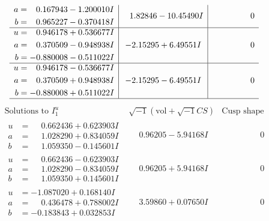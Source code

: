 \documentclass[1p]{elsarticle_modified}
\theoremstyle{definition}
\newcommand{\I}{\sqrt{-1}}
\begin{document}
$$\begin{array}{c|c|c}
\begin{aligned}
a &= \phantom{-}0.167943 - 1.200010 I \\
b &= \phantom{-}0.965227 - 0.370418 I\end{aligned}
 & \phantom{-}1.82846 - 10.45490 I & \phantom{-0.000000 } 0 \\ \hline\begin{aligned}
u &= \phantom{-}0.946178 + 0.536677 I \\
a &= \phantom{-}0.370509 - 0.948938 I \\
b &= -0.880008 - 0.511022 I\end{aligned}
 & -2.15295 + 6.49551 I & \phantom{-0.000000 } 0 \\ \hline\begin{aligned}
u &= \phantom{-}0.946178 - 0.536677 I \\
a &= \phantom{-}0.370509 + 0.948938 I \\
b &= -0.880008 + 0.511022 I\end{aligned}
 & -2.15295 - 6.49551 I & \phantom{-0.000000 } 0\\
 \hline 
 \end{array}$$\newpage$$\begin{array}{c|c|c}  
\text{Solutions to }I^u_{1}& \I (\text{vol} + \sqrt{-1}CS) & \text{Cusp shape}\\
 \hline 
\begin{aligned}
u &= \phantom{-}0.662436 + 0.623903 I \\
a &= \phantom{-}1.028290 + 0.834059 I \\
b &= \phantom{-}1.059350 - 0.145601 I\end{aligned}
 & \phantom{-}0.96205 - 5.94168 I & \phantom{-0.000000 } 0 \\ \hline\begin{aligned}
u &= \phantom{-}0.662436 - 0.623903 I \\
a &= \phantom{-}1.028290 - 0.834059 I \\
b &= \phantom{-}1.059350 + 0.145601 I\end{aligned}
 & \phantom{-}0.96205 + 5.94168 I & \phantom{-0.000000 } 0 \\ \hline\begin{aligned}
u &= -1.087020 + 0.168140 I \\
a &= \phantom{-}0.436478 + 0.788002 I \\
b &= -0.183843 + 0.032853 I\end{aligned}
 & \phantom{-}3.59860 + 0.07650 I & \phantom{-0.000000 } 0 \\ \hline\begin{aligned}

\end{aligned}
\end{array}$$
\end{document}
